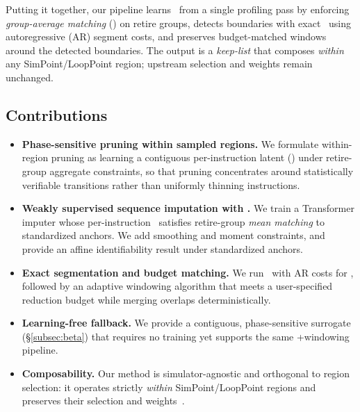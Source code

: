 Putting it together, our pipeline learns \pts\ from a single profiling pass by enforcing \emph{group-average matching} (\gam) on retire groups, detects boundaries with exact \pelt\ using autoregressive (AR) segment costs, and preserves budget-matched windows around the detected boundaries. The output is a \emph{keep-list} that composes \emph{within} any SimPoint/LoopPoint region; upstream selection and weights remain unchanged.

\subsection*{Contributions}
\begin{itemize}[leftmargin=*,noitemsep,topsep=1pt]
  \item \textbf{Phase-sensitive pruning within sampled regions.} We formulate within-region pruning as learning a contiguous per-instruction latent (\pts) under retire-group aggregate constraints, so that pruning concentrates around statistically verifiable transitions rather than uniformly thinning instructions.
  \item \textbf{Weakly supervised sequence imputation with \gam.} We train a Transformer imputer whose per-instruction \pts\ satisfies retire-group \emph{mean matching} to standardized anchors. We add smoothing and moment constraints, and provide an affine identifiability result under standardized anchors.
  \item \textbf{Exact segmentation and budget matching.} We run \pelt\ with AR costs for \cpd, followed by an adaptive windowing algorithm that meets a user-specified reduction budget while merging overlaps deterministically.
  \item \textbf{Learning-free fallback.} We provide a contiguous, phase-sensitive surrogate (\S\ref{subsec:beta}) that requires no training yet supports the same \cpd+windowing pipeline.
  \item \textbf{Composability.} Our method is simulator-agnostic and orthogonal to region selection: it operates strictly \emph{within} SimPoint/LoopPoint regions and preserves their selection and weights~\cite{simpoint-asplos02,simpoint03,simpoint-howto,looppoint}. 
\end{itemize}



